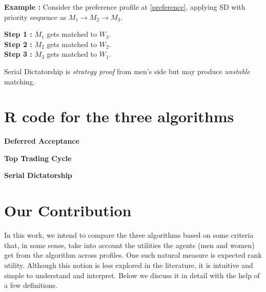 \documentclass[a4paper,11pt,table]{article}
\theoremstyle{definition}
\theoremstyle{remark}
\begin{document}
\textbf{Example :} Consider the preference profile at \ref{preference}, applying SD with priority sequence as $M_1 \rightarrow M_2 \rightarrow M_3$.\\
\begin{center}
    \textbf{Step 1 :} $M_1$ gets matched to $W_3$.\\
    \textbf{Step 2 :} $M_2$ gets matched to $W_2$.\\
    \textbf{Step 3 :} $M_3$ gets matched to $W_1$.\\
\end{center}

Serial Dictatorship is \textit{strategy proof} from men's side but may produce \textit{unstable} matching.

\section{R code for the three algorithms}
 \begin{center}
        \textbf{Deferred Acceptance}
    

    \textbf{Top Trading Cycle}
    
    \textbf{Serial Dictatorship}
    
\end{center}

\section{Our Contribution}

In this work, we intend to compare the three algorithms based on some criteria that, in some sense, take into account the utilities the agents (men and women) get from the algorithm across profiles. One such natural measure is expected rank utility. Although this notion is less explored in the literature, it is intuitive and simple to understand and interpret. Below we discuss it in detail with the help of a few definitions.
\end{document}

